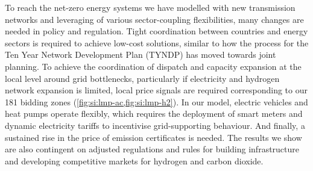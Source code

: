 To reach the net-zero energy systems we have modelled with new transmission
networks and leveraging of various sector-coupling flexibilities, many changes
are needed in policy and regulation. Tight coordination between countries and
energy sectors is required to achieve low-cost solutions, similar to how the
process for the Ten Year Network Development Plan (TYNDP) has moved towards
joint planning.\cite{entso-eTYNDP20222022} To achieve the coordination of
dispatch and capacity expansion at the local level around grid bottlenecks,
particularly if electricity and hydrogen network expansion is limited, local
price signals are required corresponding to our 181 bidding zones
(\cref{fig:si:lmp-ac,fig:si:lmp-h2}). In our model, electric vehicles and heat
pumps operate flexibly, which requires the deployment of smart meters and
dynamic electricity tariffs to incentivise grid-supporting   behaviour. And
finally, a sustained rise in the price of \co emission certificates is needed.
The results we show are also contingent on adjusted regulations and rules for
building infrastructure and developing competitive markets for hydrogen and
carbon dioxide.
